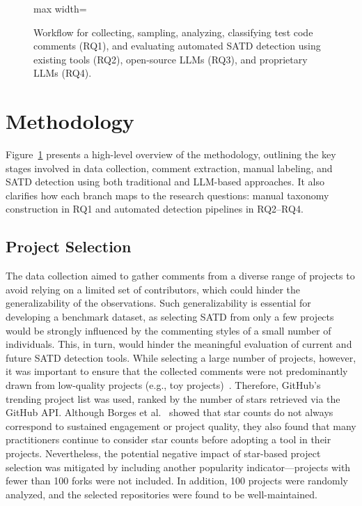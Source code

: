 \begin{figure}[!ht]
\centering
\begin{adjustbox}{max width=\textwidth}

\end{adjustbox}
\caption{Workflow for collecting, sampling, analyzing, classifying test code comments (RQ1), and evaluating automated SATD detection using existing tools (RQ2), open-source LLMs (RQ3), and proprietary LLMs (RQ4).}
\label{fig:methodology}
\end{figure}


\section{Methodology}

\label{sec:methodology}
Figure~\ref{fig:methodology} presents a high-level overview of the methodology, outlining the key stages involved in data collection, comment extraction, manual labeling, and SATD detection using both traditional and LLM-based approaches. It also clarifies how each branch maps to the research questions: manual taxonomy construction in RQ1 and automated detection pipelines in RQ2--RQ4.


\subsection{Project Selection}
The data collection aimed to gather comments from a diverse range of projects to avoid relying on a limited set of contributors, which could hinder the generalizability of the observations. Such generalizability is essential for developing a benchmark dataset, as selecting SATD from only a few projects would be strongly influenced by the commenting styles of a small number of individuals. This, in turn, would hinder the meaningful evaluation of current and future SATD detection tools.
While selecting a large number of projects, however, it was important to ensure that the collected comments were not predominantly drawn from low-quality projects (e.g., toy projects)~\cite{kalliamvakou_promises_2014}. Therefore, GitHub’s trending project list was used, ranked by the number of stars retrieved via the GitHub API. Although Borges et al.~\cite{borges_whats_2018} showed that star counts do not always correspond to sustained engagement or project quality, they also found that many practitioners continue to consider star counts before adopting a tool in their projects. Nevertheless, the potential negative impact of star-based project selection was mitigated by including another popularity indicator---projects with fewer than 100 forks were not included. In addition, 100 projects were randomly analyzed, and the selected repositories were found to be well-maintained.

